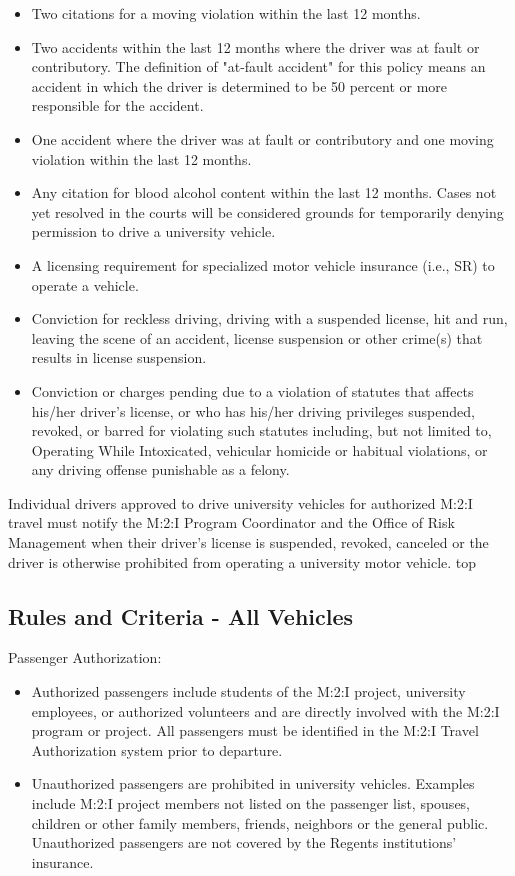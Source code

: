 {\begin{itemize}
\item Two citations for a moving violation within the last 12 months.
\item Two accidents within the last 12 months where the driver was at fault or contributory. The definition of "at-fault accident" for this policy means an accident in which the driver is determined to be 50 percent or more responsible for the accident.
\item One accident where the driver was at fault or contributory and one moving violation within the last 12 months.
\item Any citation for blood alcohol content within the last 12 months. Cases not yet resolved in the courts will be considered grounds for temporarily denying permission to drive a university vehicle.
\item A licensing requirement for specialized motor vehicle insurance (i.e., SR) to operate a vehicle.
\item Conviction for reckless driving, driving with a suspended license, hit and run, leaving the scene of an accident, license suspension or other crime(s) that results in license suspension.
\item Conviction or charges pending due to a violation of statutes that affects his/her driver's license, or who has his/her driving privileges suspended, revoked, or barred for violating such statutes including, but not limited to, Operating While Intoxicated, vehicular homicide or habitual violations, or any driving offense punishable as a felony.
\end{itemize}

Individual drivers approved to drive university vehicles for authorized M:2:I travel must notify the M:2:I Program Coordinator and the Office of Risk Management when their driver's license is suspended, revoked, canceled or the driver is otherwise prohibited from operating a university motor vehicle. top

\subsection{Rules and Criteria - All Vehicles}

Passenger Authorization:

\begin{itemize}
\item Authorized passengers include students of the M:2:I project, university employees, or authorized volunteers and are directly involved with the M:2:I program or project.  All passengers must be identified in the M:2:I Travel Authorization system prior to departure.
\item Unauthorized passengers are prohibited in university vehicles. Examples include M:2:I project members not listed on the passenger list, spouses, children or other family members, friends, neighbors or the general public. Unauthorized passengers are not covered by the Regents institutions' insurance.
\end{itemize}

}
